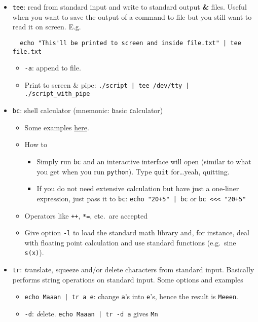 \documentclass[a4paper,12pt,%
              final%
              ]{article}
\begin{document}
\begin{itemize}
  \item \texttt{tee}: read from standard input and write to standard output \textbf{\&} files. Useful when you want to save the output of a command to file but you still want to read it on screen. E.g.
\begin{verbatim}
  echo "This'll be printed to screen and inside file.txt" | tee file.txt
\end{verbatim}
    \begin{itemize}
      \item \verb|-a|: append to file.
      \item Print to screen \& pipe: \verb!./script | tee /dev/tty | ./script_with_pipe!
    \end{itemize}
  \item \texttt{bc}: shell calculator (mnemonic: \texttt{b}asic \texttt{c}alculator)
    \begin{itemize}
      \item Some examples \href{https://www.geeksforgeeks.org/bc-command-linux-examples/}{here}.
      \item How to
        \begin{itemize}
          \item Simply run \texttt{bc} and an interactive interface will open (similar to what you get when you run \texttt{python}). Type \texttt{quit} for\ldots yeah, quitting.
          \item If you do not need extensive calculation but have just a one-liner expression, just pass it to \texttt{bc}: \verb!echo "20+5" | bc! or \verb|bc <<< "20+5"|
        \end{itemize}
      \item Operators like \verb|++|, \verb|*=|, etc.~are accepted
      \item Give option \verb|-l| to load the standard math library and, for instance, deal with floating point calculation and use standard functions (e.g.~sine \verb|s(x)|).
    \end{itemize}
  \item \texttt{tr}: \emph{tr}anslate, squeeze and/or delete characters from standard input. Basically performs string operations on standard input. Some options and examples
    \begin{itemize}
      \item \verb!echo Maaan | tr a e!: change \texttt{a}'s into \texttt{e}'s, hence the result is \texttt{Meeen}.
      \item \verb|-d|: \emph{d}elete. \verb!echo Maaan | tr -d a! gives \texttt{Mn}

\end{itemize}
\end{itemize}
\end{document}
